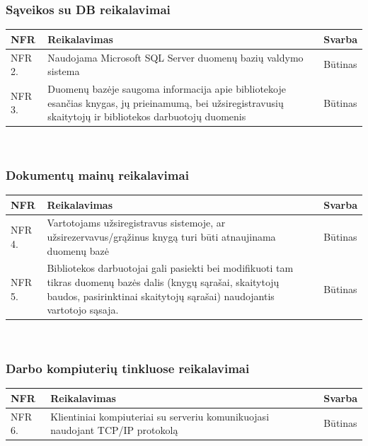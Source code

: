 \documentclass{VUMIFPSkursinis}
\begin{document}
	\subsubsection{Sąveikos su DB reikalavimai}
    \noindent
    \begin{centering}
    	\begin{tabular}{ | p{} | p{} | p{} |}
    		\hline
   			NFR & Reikalavimas & Svarba       \\ \hline
		  	NFR 2. & Naudojama Microsoft SQL Server duomenų bazių valdymo sistema & Būtinas \\ \hline
            NFR 3. & Duomenų bazėje saugoma informacija apie bibliotekoje esančias knygas, jų prieinamumą, bei užsiregistravusių skaitytojų ir bibliotekos darbuotojų duomenis & Būtinas \\ \hline
   		\end{tabular}\\
    \end{centering}
    
	\subsubsection{Dokumentų mainų reikalavimai}
    \noindent
    \begin{centering}
    	\begin{tabular}{ | p{} | p{} | p{} |}
    		\hline
   			NFR & Reikalavimas & Svarba       \\ \hline
		  	NFR 4. & Vartotojams užsiregistravus sistemoje, ar užsirezervavus/grąžinus knygą turi būti atnaujinama duomenų bazė & Būtinas \\ \hline
            NFR 5. & Bibliotekos darbuotojai gali pasiekti bei modifikuoti tam tikras duomenų bazės dalis (knygų sąrašai, skaitytojų baudos, pasirinktinai skaitytojų sąrašai) naudojantis vartotojo sąsaja. & Būtinas \\ \hline
   		\end{tabular}\\
    \end{centering}
    
    \subsubsection{Darbo kompiuterių tinkluose reikalavimai}
    \noindent
    \begin{centering}
    	\begin{tabular}{ | p{} | p{} | p{} |}
    		\hline
   			NFR & Reikalavimas & Svarba       \\ \hline
		  	NFR 6. & Klientiniai kompiuteriai su serveriu komunikuojasi naudojant TCP/IP protokolą & Būtinas \\ \hline
   		\end{tabular}\\
    \end{centering}
    
\end{document}
